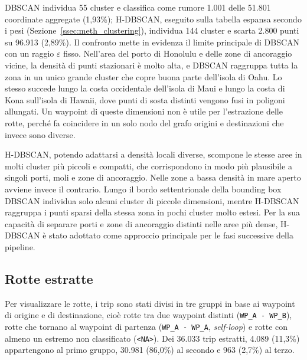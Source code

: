 DBSCAN individua 55 cluster e classifica come rumore
1.001 delle 51.801 coordinate aggregate (1,93\%); H-DBSCAN, eseguito sulla tabella
espansa secondo i pesi (Sezione~\ref{ssec:meth_clustering}), individua 144 cluster e scarta 2.800 punti su 96.913
(2,89\%). Il confronto mette in evidenza il limite principale di DBSCAN con un raggio $\varepsilon$
fisso. Nell'area del porto di Honolulu e delle zone di ancoraggio
vicine, la densità di punti stazionari è molto alta, e DBSCAN raggruppa tutta la zona in
un unico grande cluster che copre buona parte dell'isola di Oahu. Lo stesso succede lungo la costa
occidentale dell'isola di Maui e lungo la costa di Kona sull'isola di Hawaii, dove punti di sosta
distinti vengono fusi in poligoni allungati. Un waypoint di queste dimensioni non è utile
per l'estrazione delle rotte, perché fa coincidere in un solo nodo del grafo origini e
destinazioni che invece sono diverse.

H-DBSCAN, potendo adattarsi a densità locali diverse, scompone le stesse aree in molti
cluster più piccoli e compatti, che corrispondono in modo più plausibile a singoli porti,
moli e zone di ancoraggio. Nelle zone a bassa densità in mare aperto avviene invece il
contrario. Lungo il bordo settentrionale della bounding box DBSCAN individua solo alcuni
cluster di piccole dimensioni, mentre H-DBSCAN raggruppa i punti sparsi della stessa zona
in pochi cluster molto estesi. Per la sua capacità di separare porti e zone di ancoraggio
distinti nelle aree più dense, H-DBSCAN è stato adottato come approccio principale per le
fasi successive della pipeline.

 
\subsection{Rotte estratte}
 
Per visualizzare le rotte, i trip sono stati divisi in tre gruppi in base ai waypoint di
origine e di destinazione, cioè rotte tra due waypoint distinti (\texttt{WP\_A - WP\_B}),
rotte che tornano al waypoint di partenza (\texttt{WP\_A - WP\_A}, \emph{self-loop}) e rotte con almeno un estremo non classificato (\texttt{<NA>}).
Dei 36.033 trip estratti, 4.089 (11,3\%) appartengono al primo gruppo, 30.981 (86,0\%) al
secondo e 963 (2,7\%) al terzo.


